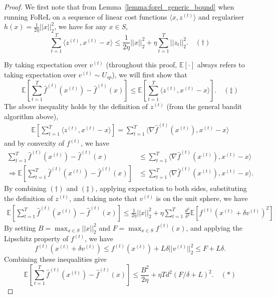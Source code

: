 \begin{proof}
    We first note that from Lemma~\ref{lemma:forel_generic_bound} when running FoReL on a sequence of linear cost functions $
    \langle x, z^{(t)} \rangle$ and regulariser $h(x) = \frac{1}{2\eta} ||x||_2^2$, we have for any $x \in S$, 
    $$ \sum_{t=1}^T \langle z^{(t)}, x^{(t)} - x \rangle \leq \frac{1}{2\eta}||x||_2^2 + \eta \sum_{t=1}^T ||z_t||_2^2. \quad (\dag) $$ 

    \noindent By taking expectation over $v^{(t)}$ (throughout this proof, $\mathbb{E}[\cdot]$ always refers to taking expectation over $v^{(t)} \sim U_{sp}$), we will first show that 
    $$
    \mathbb{E}\left[\sum_{t=1}^T \hat{f}^{(t)}(x^{(t)}) - \hat{f}^{(t)}(x) \right] \leq \mathbb{E}\left[\sum_{t=1}^T \langle z^{(t)}, x^{(t)} - x \rangle \right]. \quad (\ddag)
    $$
    The above inequality holds by the definition of $z^{(t)}$ (from the general bandit algorithm above),
    \begin{align*}
    \mathbb{E}\left[\sum_{t=1}^T \langle z^{(t)}, x^{(t)} - x \rangle \right] = \sum_{t=1}^T \langle \nabla \hat{f}^{(t)}(x^{(t)}), x^{(t)} - x \rangle 
    \end{align*}
    and by convexity of $f^{(t)}$, we have
    \begin{align*}
    \sum_{t=1}^T \hat{f}^{(t)}(x^{(t)}) - \hat{f}^{(t)}(x) &\leq \sum_{t=1}^T \langle \nabla \hat{f}^{(t)}(x^{(t)}), x^{(t)} - x \rangle \\
    \Rightarrow \mathbb{E} \left[\sum_{t=1}^T \hat{f}^{(t)}(x^{(t)}) - \hat{f}^{(t)}(x) \right] &\leq \sum_{t=1}^T \langle \nabla \hat{f}^{(t)}(x^{(t)}), x^{(t)} - x \rangle.
    \end{align*}
    By combining $(\dag)$ and $(\ddag)$, applying expectation to both sides, substituting the definition of $z^{(t)}$, and taking note that $v^{(t)}$ is on the unit sphere, we have
    \begin{align*}
        \mathbb{E}\left[\sum_{t=1}^T \hat{f}^{(t)}(x^{(t)}) - \hat{f}^{(t)}(x) \right] \leq \frac{1}{2\eta}||x||_2^2 + \eta \sum_{t=1}^T \frac{d^2}{\delta^2} \mathbb{E}\left[f^{(t)}(x^{(t)} + \delta v^{(t)})^2\right]
    \end{align*}
    By setting $B = \max_{x \in S} ||x||_2^2$ and $F = \max_{x \in S} f^{(t)}(x)$, and applying the Lipschitz property of $f^{(t)}$, we have
    $$ f^{(t)}(x^{(t)} + \delta v^{(t)}) \leq f^{(t)}(x^{(t)}) + L \delta ||v^{(t)}||_2^2 \leq F + L\delta. $$
    Combining these inequalities give
    $$ \mathbb{E}\left[\sum_{t=1}^T \hat{f}^{(t)}(x^{(t)}) - \hat{f}^{(t)}(x) \right] \leq \frac{B^2}{2\eta} + \eta T d^2 (F/\delta + L)^2. \quad (*) $$

\end{proof}

